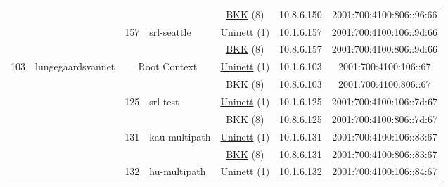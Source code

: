 \begin{small}
\begin{center}
\begin{longtable}{|c|c|c|c|c|c|c|c|}
  &  &  &  & \multicolumn{2}{|c|}{\tiny{\href{http://bkk.no}{BKK} (8)}} & \tiny{10.8.6.150} & \tiny{2001:700:4100:806::96:66} \\* \cline{3-3}\cline{4-4}\cline{5-5}\cline{6-6}\cline{7-7}\cline{8-8}
  &  & \multirow{2}{*}{\tiny{157}} & \multicolumn{1}{|l|}{\multirow{2}{*}{\tiny{srl-seattle}}} & \multicolumn{2}{|c|}{\tiny{\href{https://www.uninett.no}{Uninett} (1)}} & \tiny{10.1.6.157} & \tiny{2001:700:4100:106::9d:66} \\* \cline{5-5}\cline{6-6}\cline{7-7}\cline{8-8}
  &  &  &  & \multicolumn{2}{|c|}{\tiny{\href{http://bkk.no}{BKK} (8)}} & \tiny{10.8.6.157} & \tiny{2001:700:4100:806::9d:66} \\ \hline
 \multirow{18}{*}{\tiny{103}} & \multicolumn{1}{|l|}{\multirow{18}{*}{\tiny{lungegaardsvannet}}} & \multicolumn{2}{|c|}{\multirow{2}{*}{\tiny{Root Context}}} & \multicolumn{2}{|c|}{\tiny{\href{https://www.uninett.no}{Uninett} (1)}} & \tiny{10.1.6.103} & \tiny{2001:700:4100:106::67} \\* \cline{5-5}\cline{6-6}\cline{7-7}\cline{8-8}
  &  & \multicolumn{2}{|c|}{} & \multicolumn{2}{|c|}{\tiny{\href{http://bkk.no}{BKK} (8)}} & \tiny{10.8.6.103} & \tiny{2001:700:4100:806::67} \\* \cline{3-3}\cline{4-4}\cline{5-5}\cline{6-6}\cline{7-7}\cline{8-8}
  &  & \multirow{2}{*}{\tiny{125}} & \multicolumn{1}{|l|}{\multirow{2}{*}{\tiny{srl-test}}} & \multicolumn{2}{|c|}{\tiny{\href{https://www.uninett.no}{Uninett} (1)}} & \tiny{10.1.6.125} & \tiny{2001:700:4100:106::7d:67} \\* \cline{5-5}\cline{6-6}\cline{7-7}\cline{8-8}
  &  &  &  & \multicolumn{2}{|c|}{\tiny{\href{http://bkk.no}{BKK} (8)}} & \tiny{10.8.6.125} & \tiny{2001:700:4100:806::7d:67} \\* \cline{3-3}\cline{4-4}\cline{5-5}\cline{6-6}\cline{7-7}\cline{8-8}
  &  & \multirow{2}{*}{\tiny{131}} & \multicolumn{1}{|l|}{\multirow{2}{*}{\tiny{kau-multipath}}} & \multicolumn{2}{|c|}{\tiny{\href{https://www.uninett.no}{Uninett} (1)}} & \tiny{10.1.6.131} & \tiny{2001:700:4100:106::83:67} \\* \cline{5-5}\cline{6-6}\cline{7-7}\cline{8-8}
  &  &  &  & \multicolumn{2}{|c|}{\tiny{\href{http://bkk.no}{BKK} (8)}} & \tiny{10.8.6.131} & \tiny{2001:700:4100:806::83:67} \\* \cline{3-3}\cline{4-4}\cline{5-5}\cline{6-6}\cline{7-7}\cline{8-8}
  &  & \multirow{2}{*}{\tiny{132}} & \multicolumn{1}{|l|}{\multirow{2}{*}{\tiny{hu-multipath}}} & \multicolumn{2}{|c|}{\tiny{\href{https://www.uninett.no}{Uninett} (1)}} & \tiny{10.1.6.132} & \tiny{2001:700:4100:106::84:67} \\* \cline{5-5}\cline{6-6}\cline{7-7}\cline{8-8}

\end{longtable}
\end{center}
\end{small}
